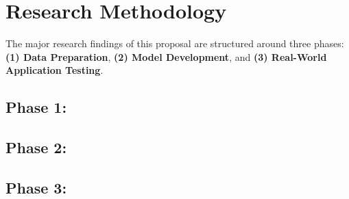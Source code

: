 \section*{Research Methodology}

The major research findings of this proposal are structured around three phases:  \textbf{(1) Data Preparation}, \textbf{(2) Model Development}, and \textbf{(3) Real-World Application Testing}.


\subsection*{Phase 1: }


\subsection*{Phase 2: }


\subsection*{Phase 3: }



